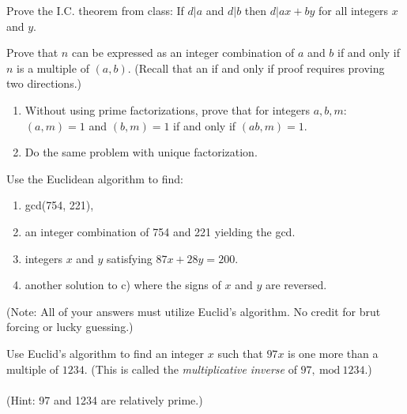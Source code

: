 \documentclass[12pt,letterpaper]{hmcpset}
\renewcommand{\t}[1]{\text{#1}}
\begin{document}

\begin{problem}[1]
    Prove the I.C. theorem from class: If $d|a$ and $d|b$ then $d|ax+by$ for all integers $x$ and $y$.
\end{problem}
\begin{solution}
    \vfill
\end{solution}
\newpage

\begin{problem}[2]
    Prove that $n$ can be expressed as an integer combination of $a$ and $b$ if and only if $n$ is a multiple of $(a,b)$.  (Recall that an if and only if proof requires proving two directions.)
\end{problem}
\begin{solution}
    \vfill
\end{solution}
\newpage

\begin{problem}[3]
    \begin{enumerate}
        \item Without using prime factorizations, prove that for integers $a,b,m$: $(a,m)=1$ and $(b,m)=1$ if and only if $(ab,m)=1$.
        \item Do the same problem with unique factorization.
    \end{enumerate}
\end{problem}
\begin{solution}
    \vfill
\end{solution}
\newpage

\begin{problem}[4]
    Use the Euclidean algorithm to find:
    \begin{enumerate}
        \item gcd(754, 221),
        \item an integer combination of 754 and 221 yielding the gcd.
        \item integers $x$ and $y$ satisfying $87x+28y=200$.
        \item another solution to c) where the signs of $x$ and $y$ are reversed.
    \end{enumerate}
    (Note: All of your answers must utilize Euclid's algorithm. No credit for brut forcing or lucky guessing.)
\end{problem}
\begin{solution}
    \vfill
\end{solution}
\newpage

\begin{problem}[5]
    Use Euclid's algorithm to find an integer $x$ such that $97x$ is one more than a multiple of $1234$.  (This is called the \textit{multiplicative inverse} of $97,~\t{mod}~1234$.)\\\\
    (Hint: 97 and 1234 are relatively prime.)
\end{problem}
\begin{solution}
    \vfill
\end{solution}
\newpage
\end{document}
